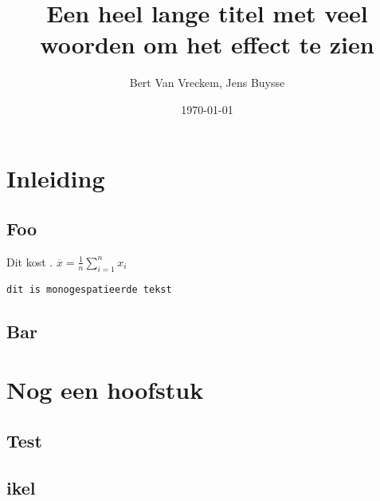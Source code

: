 \documentclass{hogent-report}
\title{Een heel lange titel met veel woorden om het effect te zien}
\author{Bert {Van Vreckem}, Jens Buysse}
\date{\today}
\begin{document}
  \inserttitlepage[hgblue]
  
  \usechapterimagefalse

  \tableofcontents
  
  \chapter{Inleiding}
  
  \lipsum[1]
  
  \section{Foo}
  
  Dit kost . $\overline{x} = \frac{1}{n} \sum_{i = 1}^{n} x_i$
  
  \texttt{dit is monogespatieerde tekst}
  
  \lipsum[2-3]
  
  \section{Bar}
  
  \lipsum[4-6]
  
  \chapter{Nog een hoofstuk}
  
  \lipsum[7]
  
  \section{Test}
  
  \lipsum[8-10]
  
  \section{ikel}
  
  \lipsum[11-15]
  
\end{document}

